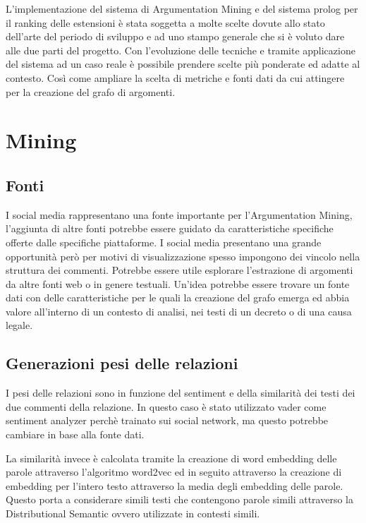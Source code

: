 


L'implementazione del sistema di Argumentation Mining e del sistema prolog per il ranking delle estensioni è stata soggetta a molte scelte dovute allo stato dell'arte del periodo di sviluppo e ad uno stampo generale che si è voluto dare alle due parti del progetto. Con l'evoluzione delle tecniche e tramite applicazione del sistema ad un caso reale è possibile prendere scelte più ponderate ed adatte al contesto. Così come ampliare la scelta di metriche e fonti dati da cui attingere per la creazione del grafo di argomenti.


\section{Mining}
\label{section:ranking}

\subsection {Fonti} 
I social media rappresentano una fonte importante per l'Argumentation Mining, l'aggiunta di altre fonti potrebbe essere guidato da caratteristiche specifiche offerte dalle specifiche piattaforme. I social media presentano una grande opportunità però per motivi di visualizzazione spesso impongono dei vincolo nella struttura dei commenti. Potrebbe essere utile esplorare l'estrazione di argomenti da altre fonti web o in genere testuali. Un'idea potrebbe essere trovare un fonte dati con delle caratteristiche per le quali la creazione del grafo emerga ed abbia valore all'interno di un contesto di analisi, nei testi di un decreto o di una causa legale.

\subsection {Generazioni pesi delle relazioni} 
I pesi delle relazioni sono in funzione del sentiment e della similarità dei testi dei due commenti della relazione. In questo caso è stato utilizzato vader \cite{hutto2014vader} come sentiment analyzer perchè trainato sui social network, ma questo potrebbe cambiare in base alla fonte dati.

La similarità invece è calcolata tramite la creazione di word embedding delle parole attraverso l'algoritmo word2vec \cite{} ed in seguito attraverso la creazione di embedding per l'intero testo attraverso la media degli embedding delle parole. Questo porta a considerare simili testi che contengono parole simili attraverso la Distributional Semantic ovvero utilizzate in contesti simili.


